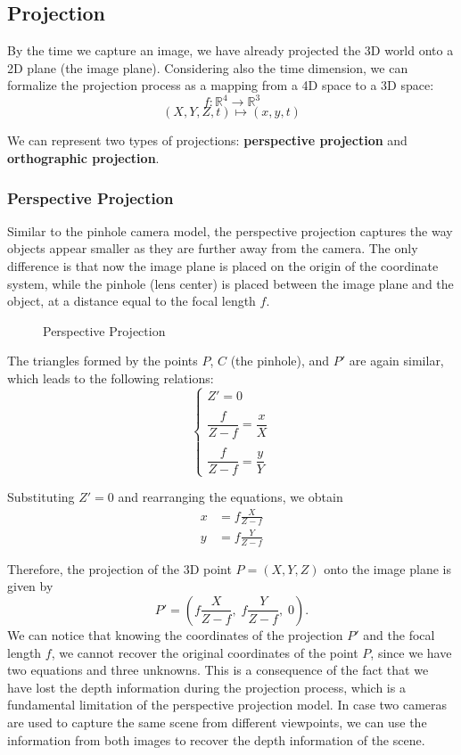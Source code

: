 \subsection{Projection}
By the time we capture an image, we have already projected the 3D world onto a 2D plane (the image plane).
Considering also the time dimension, we can formalize the projection process as a mapping from a 4D space to a 3D space:
\[f: \mathbb{R}^4 \rightarrow \mathbb{R}^3\]
\[ (X, Y, Z, t) \mapsto (x, y, t)\]

We can represent two types of projections: \textbf{perspective projection} and \textbf{orthographic projection}.

\subsubsection{Perspective Projection}
Similar to the pinhole camera model, the perspective projection captures the way objects appear smaller as they are further away from the camera.
The only difference is that now the image plane is placed on the origin of the coordinate system, while the pinhole (lens center) is placed between the image plane and the object,
at a distance equal to the focal length $f$.
\begin{figure}[H]
    \centering
    \scalebox{0.8}{
        
    }
    \caption{Perspective Projection}
\end{figure}
The triangles formed by the points $P$, $C$ (the pinhole), and $P'$ are again similar, which leads to the following relations:
\begin{equation*}
\begin{cases}
Z' = 0 \\\\
\dfrac{f}{Z - f} = \dfrac{x}{X} \\\\
\dfrac{f}{Z - f} = \dfrac{y}{Y}
\end{cases}
\end{equation*}

Substituting $Z' = 0$ and rearranging the equations, we obtain
\begin{align*}
x &= f \frac{X}{Z - f} \\
y &= f \frac{Y}{Z - f}
\end{align*}

Therefore, the projection of the 3D point $P=(X,Y,Z)$ onto the image plane is given by
\[
P' = \left(f \frac{X}{Z - f},\; f \frac{Y}{Z - f},\; 0\right).
\]
We can notice that knowing the coordinates of the projection $P'$ and the focal length $f$, we cannot recover the original coordinates of the point $P$, since we have two equations and three unknowns.
This is a consequence of the fact that we have lost the depth information during the projection process, which is a fundamental limitation of the perspective projection model.
In case two cameras are used to capture the same scene from different viewpoints, we can use the information from both images to recover the depth information of the scene.

